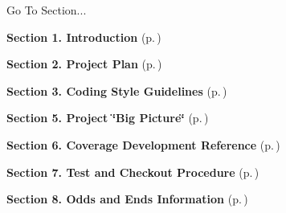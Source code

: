 \begin{Desc}
\item[Go To Section...]\par
\begin{CompactItemize}
\item 
{\bf Section 1.  Introduction} {\rm (p.\,\pageref{page_intro})}\item 
{\bf Section 2.  Project Plan} {\rm (p.\,\pageref{page_project_plan})}\item 
{\bf Section 3.  Coding Style Guidelines} {\rm (p.\,\pageref{page_code_style})}\item 
{\bf Section 5.  Project \char`\"{}Big Picture\char`\"{}} {\rm (p.\,\pageref{page_big_picture})}\item 
{\bf Section 6.  Coverage Development Reference} {\rm (p.\,\pageref{page_code_details})}\item 
{\bf Section 7.  Test and Checkout Procedure} {\rm (p.\,\pageref{page_testing})}\item 
{\bf Section 8.  Odds and Ends Information} {\rm (p.\,\pageref{page_misc})}\end{CompactItemize}
\end{Desc}

